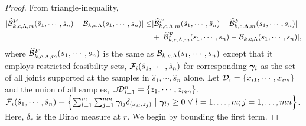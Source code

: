 \begin{proof} From triangle-inequality, 
\allowdisplaybreaks
\begin{align}\label{inq:bcons_ti}
|\widehat{\mathcal{B}}^F_{k,c,\Lambda, m}(\hat{s}_{1}, \cdots, \hat{s}_{n})-\mathcal{B}_{k, c, \Lambda}(s_1, \cdots, s_n)| \leq &|\widehat{\mathcal{B}}^F_{k,c,\Lambda, m}(\hat{s}_{1}, \cdots, \hat{s}_{n})-\widehat{\mathcal{B}}^F_{k,c,\Lambda, m}(s_1, \cdots, s_n)|\nonumber\\
&+|\widehat{\mathcal{B}}^F_{k,c,\Lambda, m}(s_1, \cdots, s_n)-\mathcal{B}_{k, c, \Lambda}(s_1, \cdots, s_n)|,
\end{align}
where $\widehat{\mathcal{B}}^F_{k,c,\Lambda, m}(s_1, \cdots, s_n)$ is the same as $\mathcal{B}_{k, c, \Lambda}(s_1, \cdots, s_n)$ except that it employs restricted feasibility sets, $\mathcal{F}_i(\hat{s}_{1}, \cdots, \hat{s}_{n})$ for corresponding $\bm{\gamma}_i$ as the set of all joints supported at the samples in $\hat{s}_{1}, \cdots, \hat{s}_{n}$ alone. Let $\mathcal{D}_i=\{x_{i1}, \cdots, x_{im}\}$ and the union of all samples, $\cup\mathcal{D}_{i=1}^n=\{z_1,\cdots, z_{mn}\}$.\newline
$\calF_i(\hat{s}_{1}, \cdots, \hat{s}_{n})\equiv\left\{\sum_{l=1}^{m}\sum_{j=1}^{mn}\bgamma_{lj}\delta_{(x_{il},z_{j})}\ |\ \bgamma_{lj}\ge0\ \forall\ l=1,\ldots,m; j=1,\ldots,mn\right\}$. Here, $\delta_r$ is the Dirac measure at $r$. We begin by bounding the first term.


\end{proof}
